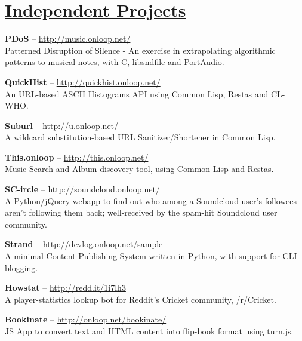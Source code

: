 \documentclass[10pt,a4paper]{moderncv}
\begin{document}

\section{{\href{http://github.com/pranavrc/}{Independent Projects}}}

\cvlistitem
{\textbf{PDoS} -- {{\href{http://music.onloop.net/}{\small http://music.onloop.net/}}}
  \\Patterned Disruption of Silence - An exercise in extrapolating algorithmic patterns to musical notes, with C, libsndfile and PortAudio.}

\cvlistitem
{\textbf{QuickHist} -- {{\href{http://quickhist.onloop.net/}{\small http://quickhist.onloop.net/}}}
  \\An URL-based ASCII Histograms API using Common Lisp, Restas and CL-WHO.}

\cvlistitem
{\textbf{Suburl} -- {{\href{http://u.onloop.net/}{\small
http://u.onloop.net/}}}
  \\A wildcard substitution-based URL Sanitizer/Shortener in Common Lisp.}

\cvlistitem
{\textbf{This.onloop} -- {{\href{http://this.onloop.net/}{\small http://this.onloop.net/}}}
  \\Music Search and Album discovery tool, using Common Lisp and Restas.}

\cvlistitem
{\textbf{SC-ircle} -- {{\href{http://soundcloud.onloop.net/}{\small http://soundcloud.onloop.net/}}}
  \\A Python/jQuery webapp to find out who among a Soundcloud user's followees aren't following them back; well-received by the spam-hit Soundcloud user community.}

\cvlistitem
{\textbf{Strand} -- {{\href{http://devlog.onloop.net/sample}{\small http://devlog.onloop.net/sample}}}
  \\A minimal Content Publishing System written in Python, with support for CLI blogging.}

\cvlistitem
{\textbf{Howstat} -- {{\href{http://redd.it/1i7lh3}{\small http://redd.it/1i7lh3}}}
  \\A player-statistics lookup bot for Reddit's Cricket community, /r/Cricket.}

\cvlistitem
{\textbf{Bookinate} -- {{\href{http://onloop.net/bookinate}{\small http://onloop.net/bookinate/}}}
  \\JS App to convert text and HTML content into flip-book format using turn.js.}
\end{document}
